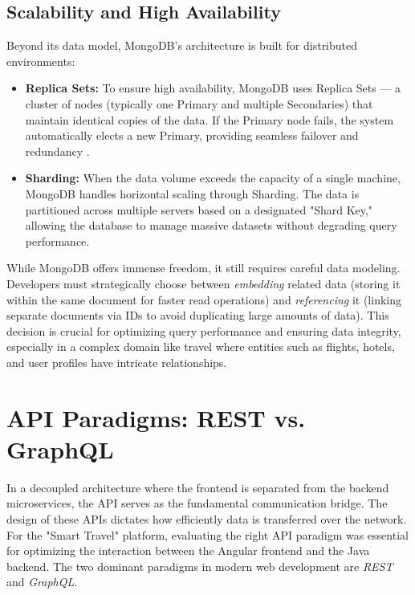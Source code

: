 \subsection{Scalability and High Availability}

Beyond its data model, MongoDB's architecture is built for distributed environments:
\begin{itemize}
    \item \textbf{Replica Sets:} To ensure high availability, MongoDB uses Replica Sets — a cluster of nodes (typically one Primary and multiple Secondaries) that maintain identical copies of the data. If the Primary node fails, the system automatically elects a new Primary, providing seamless failover and redundancy \cite{medium_mongodb_architecture}.
    \item \textbf{Sharding:} When the data volume exceeds the capacity of a single machine, MongoDB handles horizontal scaling through Sharding. The data is partitioned across multiple servers based on a designated "Shard Key," allowing the database to manage massive datasets without degrading query performance.
\end{itemize}

While MongoDB offers immense freedom, it still requires careful data modeling. Developers must strategically choose between \textit{embedding} related data (storing it within the same document for faster read operations) and \textit{referencing} it (linking separate documents via IDs to avoid duplicating large amounts of data). This decision is crucial for optimizing query performance and ensuring data integrity, especially in a complex domain like travel where entities such as flights, hotels, and user profiles have intricate relationships.



\section{API Paradigms: REST vs. GraphQL}
\label{sec:api_paradigms}

In a decoupled architecture where the frontend is separated from the backend microservices, the API serves as the fundamental communication bridge. The design of these APIs dictates how efficiently data is transferred over the network. For the "Smart Travel" platform, evaluating the right API paradigm was essential for optimizing the interaction between the Angular frontend and the Java backend. The two dominant paradigms in modern web development are \textit{REST} and \textit{GraphQL}.

